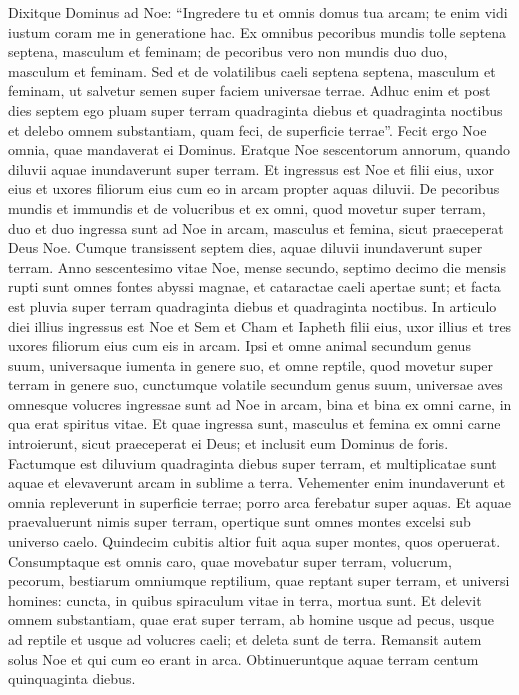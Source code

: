 \begin{biblechapter}
\begin{biblechapter}
\begin{biblechapter}
\begin{biblechapter}
\begin{biblechapter}
\begin{biblechapter}
\begin{biblechapter}
\verse Dixitque Dominus ad Noe: “Ingredere tu et omnis domus tua arcam; te enim vidi iustum coram me in generatione hac. 
\verse Ex omnibus pecoribus mundis tolle septena septena, masculum et feminam; de pecoribus vero non mundis duo duo, masculum et feminam. 
\verse Sed et de volatilibus caeli septena septena, masculum et feminam, ut salvetur semen super faciem universae terrae. 
\verse Adhuc enim et post dies septem ego pluam super terram quadraginta diebus et quadraginta noctibus et delebo omnem substantiam, quam feci, de superficie terrae”. 
\verse Fecit ergo Noe omnia, quae mandaverat ei Dominus. 
\verse Eratque Noe sescentorum annorum, quando diluvii aquae inundaverunt super terram.
 \verse Et ingressus est Noe et filii eius, uxor eius et uxores filiorum eius cum eo in arcam propter aquas diluvii. 
\verse De pecoribus mundis et immundis et de volucribus et ex omni, quod movetur super terram, 
\verse duo et duo ingressa sunt ad Noe in arcam, masculus et femina, sicut praeceperat Deus Noe. 
\verse Cumque transissent septem dies, aquae diluvii inundaverunt super terram.
 \verse Anno sescentesimo vitae Noe, mense secundo, septimo decimo die mensis rupti sunt omnes fontes abyssi magnae, et cataractae caeli apertae sunt; 
\verse et facta est pluvia super terram quadraginta diebus et quadraginta noctibus. 
\verse In articulo diei illius ingressus est Noe et Sem et Cham et Iapheth filii eius, uxor illius et tres uxores filiorum eius cum eis in arcam. 
\verse Ipsi et omne animal secundum genus suum, universaque iumenta in genere suo, et omne reptile, quod movetur super terram in genere suo, cunctumque volatile secundum genus suum, universae aves omnesque volucres 
\verse ingressae sunt ad Noe in arcam, bina et bina ex omni carne, in qua erat spiritus vitae. 
\verse Et quae ingressa sunt, masculus et femina ex omni carne introierunt, sicut praeceperat ei Deus; et inclusit eum Dominus de foris.
 \verse Factumque est diluvium quadraginta diebus super terram, et multiplicatae sunt aquae et elevaverunt arcam in sublime a terra. 
\verse Vehementer enim inundaverunt et omnia repleverunt in superficie terrae; porro arca ferebatur super aquas. 
\verse Et aquae praevaluerunt nimis super terram, opertique sunt omnes montes excelsi sub universo caelo. 
\verse Quindecim cubitis altior fuit aqua super montes, quos operuerat.
 \verse Consumptaque est omnis caro, quae movebatur super terram, volucrum, pecorum, bestiarum omniumque reptilium, quae reptant super terram, et universi homines: 
 \verse cuncta, in quibus spiraculum vitae in terra, mortua sunt. 
\verse Et delevit omnem substantiam, quae erat super terram, ab homine usque ad pecus, usque ad reptile et usque ad volucres caeli; et deleta sunt de terra. Remansit autem solus Noe et qui cum eo erant in arca. 
\verse Obtinueruntque aquae terram centum quinquaginta diebus.
 

\end{biblechapter}
\end{biblechapter}
\end{biblechapter}
\end{biblechapter}
\end{biblechapter}
\end{biblechapter}
\end{biblechapter}
